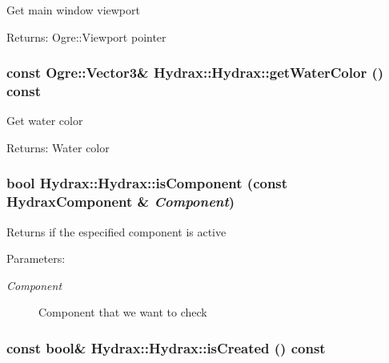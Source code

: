 Get main window viewport \begin{Desc}
\item[Returns:]Ogre::Viewport pointer \end{Desc}
\hypertarget{class_hydrax_1_1_hydrax_0e0da539fe181e84a115368e97eff0c6}{
\subsubsection[{getWaterColor}]{\setlength{\rightskip}{0pt plus 5cm}const Ogre::Vector3\& Hydrax::Hydrax::getWaterColor () const}}
\label{class_hydrax_1_1_hydrax_0e0da539fe181e84a115368e97eff0c6}


Get water color \begin{Desc}
\item[Returns:]Water color \end{Desc}
\hypertarget{class_hydrax_1_1_hydrax_69e3ff9c4de804dec54156453837df95}{
\subsubsection[{isComponent}]{\setlength{\rightskip}{0pt plus 5cm}bool Hydrax::Hydrax::isComponent (const {\bf HydraxComponent} \& {\em Component})}}
\label{class_hydrax_1_1_hydrax_69e3ff9c4de804dec54156453837df95}


Returns if the especified component is active \begin{Desc}
\item[Parameters:]
\begin{description}
\item[{\em Component}]Component that we want to check \end{description}
\end{Desc}
\hypertarget{class_hydrax_1_1_hydrax_58b37d035d0391ce7873a21240c83207}{
\subsubsection[{isCreated}]{\setlength{\rightskip}{0pt plus 5cm}const bool\& Hydrax::Hydrax::isCreated () const}}
\label{class_hydrax_1_1_hydrax_58b37d035d0391ce7873a21240c83207}


